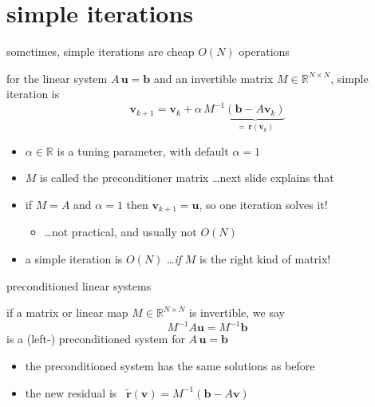 \documentclass[10pt,
               svgnames,
               hyperref={colorlinks,citecolor=DeepPink4,linkcolor=FireBrick,urlcolor=Maroon},
               usepdftitle=false]{beamer}
\newcommand{\bb}{\mathbf{b}}
\newcommand{\br}{\mathbf{r}}
\newcommand{\bu}{\mathbf{u}}
\newcommand{\bv}{\mathbf{v}}
\newcommand{\RR}{\mathbb{R}}
\begin{document}

\section{simple iterations}

\begin{frame}{sometimes, simple iterations are cheap $O(N)$ operations}

\begin{definition} for the linear system $A\,\bu=\bb$ and an invertible matrix $M\in \RR^{N\times N}$, \alert{simple iteration} is
    $$\bv_{k+1} = \bv_k + \alpha\, M^{-1} \underbrace{\left(\bb - A \bv_k\right)}_{=\,\br(\bv_k)}$$
\end{definition}

\begin{itemize}
\item $\alpha\in\RR$ is a tuning parameter, with default $\alpha=1$
\item $M$ is called the \alert{preconditioner matrix} \dots next slide explains that
\item if $M=A$ and $\alpha=1$ then $\bv_{k+1}=\bu$, so one iteration solves it!
	\begin{itemize}
	\item[$\circ$] \dots not practical, and usually not $O(N)$
	\end{itemize}

\medskip
\item a simple iteration is $O(N)$ \dots \emph{if} $M$ is the right kind of matrix!
\end{itemize}
\end{frame}


\begin{frame}{preconditioned linear systems}

\begin{definition} if a matrix or linear map $M \in \RR^{N\times N}$ is invertible, we say
    $$M^{-1} A \bu = M^{-1} \bb$$
is a \alert{(left-) preconditioned} system for $A\,\bu=\bb$
\end{definition}

\begin{itemize}
\item the preconditioned system has the same solutions as before
\item the new residual is \, $\tilde{\br}(\bv) = M^{-1} (\bb - A \bv)$
\end{itemize}
\end{frame}
\end{document}
